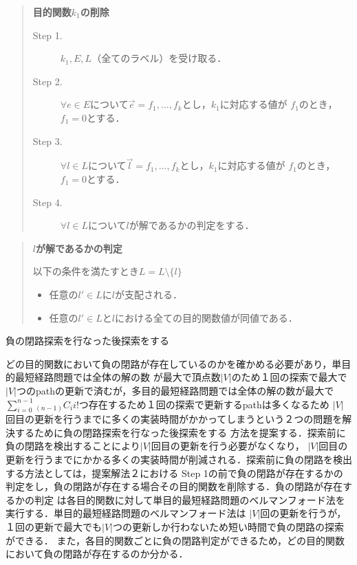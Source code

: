\documentclass[12pt]{optlab-bachelor}
\begin{document}
\begin{quote}
  \textbf{目的関数$k_1$の削除}
  \begin{description}
    \item[Step 1.] $k_1,E,L$（全てのラベル）を受け取る．
    \item[Step 2.] $\forall e \in E$について$\vec{e}={f_1,\ldots,f_k}$とし，$k_1$に対応する値が
    $f_1$のとき，$f_1=0$とする．
    \item[Step 3.] $\forall l \in L$について$\vec{l}={f_1,\ldots,f_k}$とし，$k_1$に対応する値が
    $f_1$のとき，$f_1=0$とする．
    \item[Step 4.] $\forall l \in L$について$l$が解であるかの判定をする．
  \end{description}
\end{quote}

\begin{quote}
  \textbf{$l$が解であるかの判定}

  以下の条件を満たすとき$L=L \setminus \{ l\}$
    \begin{itemize}
      \item 任意の$l' \in L$に$l$が支配される．
      \item 任意の$l' \in L$と$l$における全ての目的関数値が同値である．
    \end{itemize}
\end{quote}

\begin{description}
  \item[負の閉路探索を行なった後探索をする]
\end{description}

どの目的関数において負の閉路が存在しているのかを確かめる必要があり，単目的最短経路問題では全体の解の数
が最大で頂点数$|V|$のため１回の探索で最大で$|V|$つのpathの更新で済むが，多目的最短経路問題では全体の解の数が最大で
$\displaystyle \sum_{i=0}^{n-1} {}_{(n-1)}C_i i!$つ存在するため１回の探索で更新するpathは多くなるため
$|V|$回目の更新を行うまでに多くの実装時間がかかってしまうという２つの問題を解決するために負の閉路探索を行なった後探索をする
方法を提案する．探索前に負の閉路を検出することにより$|V|$回目の更新を行う必要がなくなり，
$|V|$回目の更新を行うまでにかかる多くの実装時間が削減される．探索前に負の閉路を検出する方法としては，提案解法２における
Step 1の前で負の閉路が存在するかの判定をし，負の閉路が存在する場合その目的関数を削除する．負の閉路が存在するかの判定
は各目的関数に対して単目的最短経路問題のベルマンフォード法を実行する．単目的最短経路問題のベルマンフォード法は
$|V|$回の更新を行うが，１回の更新で最大でも$|V|$つの更新しか行わないため短い時間で負の閉路の探索ができる．
また，各目的関数ごとに負の閉路判定ができるため，どの目的関数において負の閉路が存在するのか分かる．
\end{document}
